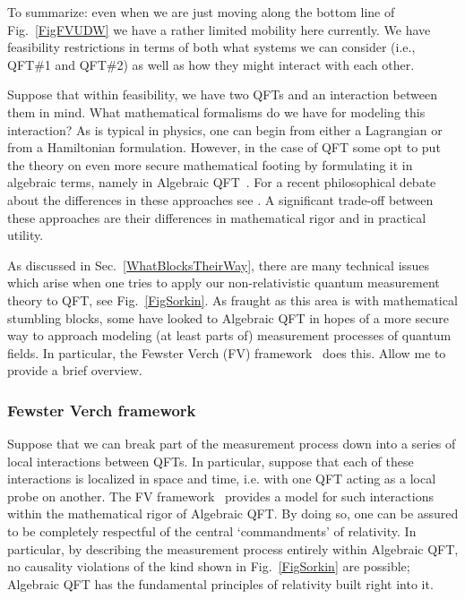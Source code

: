 \documentclass[12pt,prd,superscriptaddress,floatfix,amsmath,amssymb,amsfonts,nofootinbib]{revtex4-2}
\begin{document}

To summarize: even when we are just moving along the bottom line of Fig.~\ref{FigFVUDW} we have a rather limited mobility here currently. We have feasibility restrictions in terms of both what systems we can consider (i.e., QFT\#1 and QFT\#2) as well as how they might interact with each other.

Suppose that within feasibility, we have two QFTs and an interaction between them in mind. What mathematical formalisms do we have for modeling this interaction? As is typical in physics, one can begin from either a Lagrangian or from a Hamiltonian formulation. However, in the case of QFT some opt to put the theory on even more secure mathematical footing by formulating it in algebraic terms, namely in Algebraic QFT~\cite{sep-qt-nvd}. For a recent philosophical debate about the differences in these approaches see \cite{WallaceNaive,Wallace2011,Fraser2009,Fraser2011}. A significant trade-off between these approaches are their differences in mathematical rigor and in practical utility.

As discussed in Sec.~\ref{WhatBlocksTheirWay}, there are many technical issues which arise when one tries to apply our non-relativistic quantum measurement theory to QFT, see Fig.~\ref{FigSorkin}. As fraught as this area is with mathematical stumbling blocks, some have looked to Algebraic QFT in hopes of a more secure way to approach modeling (at least parts of) measurement processes of quantum fields. In particular, the Fewster Verch (FV) framework~\cite{fewster1,fewster2,fewster3} does this. Allow me to provide a brief overview.

\subsubsection*{Fewster Verch framework}
Suppose that we can break part of the measurement process down into a series of local interactions between QFTs. In particular, suppose that each of these interactions is localized in space and time, i.e. with one QFT acting as a local probe on another. The FV framework~\cite{fewster1,fewster2,fewster3} provides a model for such interactions within the mathematical rigor of Algebraic QFT. By doing so, one can be assured to be completely respectful of the central `commandments' of relativity. In particular, by describing the measurement process entirely within Algebraic QFT, no causality violations of the kind shown in Fig.~\ref{FigSorkin} are possible; Algebraic QFT has the fundamental principles of relativity built right into it.
\end{document}
